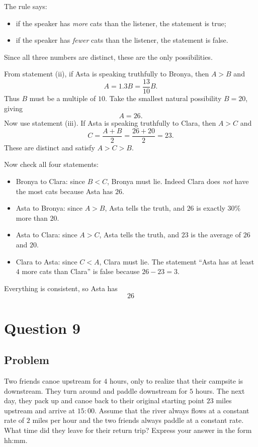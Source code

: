 \documentclass[12pt]{article}
\begin{document}
The rule says:
\begin{itemize}
    \item if the speaker has \emph{more} cats than the listener, the statement is true;
    \item if the speaker has \emph{fewer} cats than the listener, the statement is false.
\end{itemize}
Since all three numbers are distinct, these are the only possibilities.

From statement (ii), if Asta is speaking truthfully to Bronya, then $A>B$ and
\[
A = 1.3B = \frac{13}{10}B.
\]
Thus $B$ must be a multiple of $10$.
Take the smallest natural possibility $B=20$, giving
\[
A=26.
\]
Now use statement (iii). If Asta is speaking truthfully to Clara, then $A>C$ and
\[
C = \frac{A+B}{2} = \frac{26+20}{2}=23.
\]
These are distinct and satisfy $A>C>B$.

Now check all four statements:
\begin{itemize}
    \item Bronya to Clara: since $B<C$, Bronya must lie. Indeed Clara does \emph{not} have the most cats because Asta has $26$.
    \item Asta to Bronya: since $A>B$, Asta tells the truth, and $26$ is exactly $30\%$ more than $20$.
    \item Asta to Clara: since $A>C$, Asta tells the truth, and $23$ is the average of $26$ and $20$.
    \item Clara to Asta: since $C<A$, Clara must lie. The statement ``Asta has at least $4$ more cats than Clara'' is false because $26-23=3$.
\end{itemize}
Everything is consistent, so Asta has
\[
\boxed{26}
\]

\newpage
\section{Question 9}
\subsection{Problem}
Two friends canoe upstream for $4$ hours, only to realize that their campsite is downstream. They turn around and paddle downstream for $5$ hours. The next day, they pack up and canoe back to their original starting point $23$ miles upstream and arrive at $15{:}00$. Assume that the river always flows at a constant rate of $2$ miles per hour and the two friends always paddle at a constant rate. What time did they leave for their return trip? Express your answer in the form hh:mm.
\end{document}
